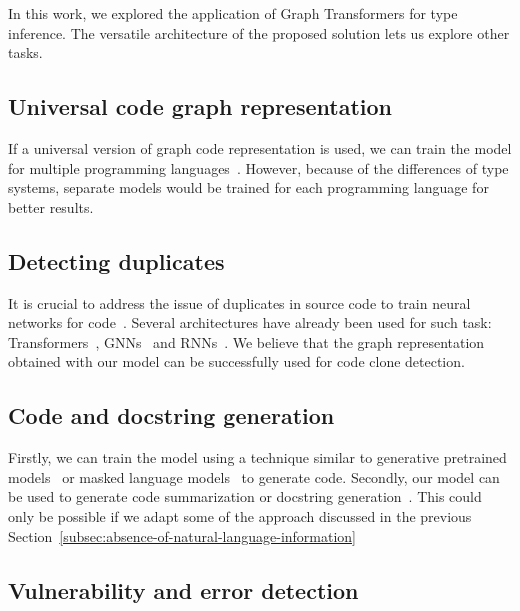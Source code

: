 In this work, we explored the application of Graph Transformers for type inference.
The versatile architecture of the proposed solution lets us explore other tasks.

\subsection{Universal code graph representation}\label{subsec:universal-code-graph-representation}

If a universal version of graph code representation is used, we can train the model for multiple programming languages~\cite{wang_unified_2022}.
However, because of the differences of type systems, separate models would be trained for each programming language for better results.

\subsection{Detecting duplicates}\label{subsec:detecting-duplicates}

It is crucial to address the issue of duplicates in source code to train neural networks for code~\cite{allamanis2020typilus,mir_type4py_2021}.
Several architectures have already been used for such task: Transformers~\cite{zhang2023efficient}, GNNs~\cite{wang_detecting_2020} and RNNs~\cite{yasaswi2017plagiarism}.
We believe that the graph representation obtained with our model can be successfully used for code clone detection.

\subsection{Code and docstring generation}\label{subsec:code-generation}

Firstly, we can train the model using a technique similar to generative pretrained models~\cite{radford_language_2019,brown_language_2020} or masked language models~\cite{tipirneni_structcoder_2022} to generate code.
Secondly, our model can be used to generate code summarization or docstring generation~\cite{barone_parallel_2017,liu_haconvgnn_2021}.
This could only be possible if we adapt some of the approach discussed in the previous Section~\ref{subsec:absence-of-natural-language-information}

\subsection{Vulnerability and error detection}\label{subsec:vulnerability-and-error-detection}

